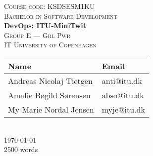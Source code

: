 \newcommand{\HRule}{\rule{1.25\linewidth}{0.5mm}}
\center
\vspace*{-4.35cm}
%
\vspace{3cm}
\textsc{\large Course code: KSDSESM1KU}
\\[0.2cm]
\textsc{\large Bachelor in Software Development}
\\[0.5cm]
\hbox{\makebox[1\textwidth][c]{\HRule}}
\vspace{0.4cm}
{ \huge \bfseries DevOps: ITU-MiniTwit}
\\[0.6cm]
\hbox{\makebox[1\textwidth][c]{\HRule}}
\vspace{0.9cm}
\textsc{\Large Group E --- Grl Pwr\\[0.5cm]IT University of Copenhagen}\\[1.5cm]
\begin{tabular}{ll}
\toprule
\textbf{Name} & \textbf{Email} \\
\midrule
Andreas Nicolaj Tietgen & anti@itu.dk \\
Amalie Bøgild Sørensen & abso@itu.dk \\
My Marie Nordal Jensen & myje@itu.dk \\
\bottomrule
\end{tabular}
\\[2cm]
{\large \today}
\\[1.5cm]
{\large 2500 words}
\vfill

